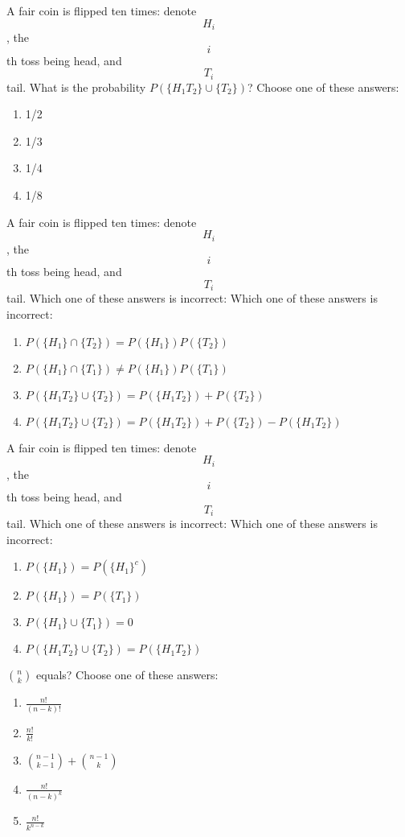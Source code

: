\documentclass[poll_tutorial_format]{subfiles}
\begin{document}
	\begin{exercise}
		A fair coin is flipped ten times: denote $$H_i$$, the $$i$$th toss being head, and $$T_i$$ tail. What is the probability $P( \{H_1T_2\} \cup \{T_2\} )$?
	Choose one of these answers:
	\begin{enumerate}
		\item 1/2
		\item 1/3
		\item 1/4
		\item 1/8
	\end{enumerate}
\end{exercise}

	\begin{exercise}
A fair coin is flipped ten times: denote $$H_i$$, the $$i$$th toss being head, and $$T_i$$ tail. Which one of these answers is incorrect:
	Which one of these answers is incorrect:
	\begin{enumerate}
		\item $P( \{H_1\} \cap \{T_2\} )=P( \{H_1\})P( \{T_2\} )$
		\item $P( \{H_1 \} \cap \{T_1\} )\neq  P( \{H_1\})P( \{T_1\} )$
		\item $P( \{H_1T_2\} \cup \{T_2\} )=P( \{H_1T_2\} )+P( \{T_2\} )$
		\item $P( \{H_1T_2\} \cup \{T_2\} )=P( \{H_1T_2\} )+P( \{T_2\} )-P( \{H_1T_2\} )$
	\end{enumerate}
\end{exercise}


	\begin{exercise}
A fair coin is flipped ten times: denote $$H_i$$, the $$i$$th toss being head, and $$T_i$$ tail. Which one of these answers is incorrect:
	Which one of these answers is incorrect:
	\begin{enumerate}
		\item $P( \{H_1\})=P( \{H_1\}^c)$
		\item $P( \{H_1 \} )=P( \{T_1\} )$
		\item $P( \{H_1\} \cup \{T_1\} )=0$
		\item $P( \{H_1T_2\} \cup \{T_2\} )=P( \{H_1T_2\} ) $
	\end{enumerate}
\end{exercise}


	
	\begin{exercise}
		${n\choose k}$ equals?
		Choose one of these answers:
		\begin{enumerate}
			\item $\frac{n!}{(n-k)!}$
			\item $\frac{n!}{k!}$
			\item ${n-1\choose k-1} +{n-1\choose k}$
			\item $\frac{n!}{(n-k)^k}$
			\item $\frac{n!}{k^{n-k}}$
		\end{enumerate}
	\end{exercise}
	
\end{document}
